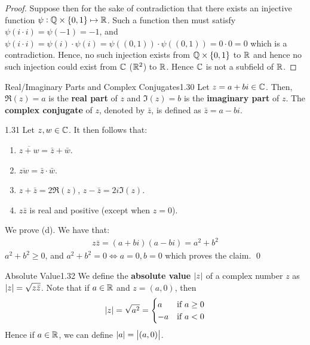 \begin{proof}
    Suppose then for the sake of contradiction that there exists an injective function $\psi: \mathbb{Q} \times \set{0, 1} \mapsto \mathbb{R}$. Such a function then must satisfy$\psi(i \cdot i) = \psi(-1) = -1$, and $\psi(i \cdot i) = \psi(i) \cdot \psi(i) = \psi((0, 1))\cdot \psi((0, 1)) = 0 \cdot 0 = 0$ which is a contradiction. Hence, no such injection exists from $\mathbb{Q} \times \set{0, 1}$ to $\mathbb{R}$ and hence no such injection could exist from $\mathbb{C}$ ($\mathbb{R}^2$) to $\mathbb{R}$. Hence $\mathbb{C}$ is not a subfield of $\mathbb{R}$. 
\end{proof}



\begin{definition}{Real/Imaginary Parts and Complex Conjugates}{1.30}
Let $z = a + bi \in \mathbb{C}$. Then, $\Re(z) = a$ is the \textbf{real part} of $z$ and $\Im(z) = b$ is the \textbf{imaginary part} of $z$. The \textbf{complex conjugate} of $z$, denoted by $\bar{z}$, is defined as $\bar{z} = a - bi$. 
\end{definition}

\begin{theorem}{}{1.31}
    Let $z, w \in \mathbb{C}$. It then follows that:
    \begin{enumerate}
        \item $\overline{z + w} = \bar{z} + \bar{w}$.
        \item $\overline{zw} = \bar{z} \cdot \bar{w}$.
        \item $z + \bar{z} = 2\Re(z)$, $z - \bar{z} = 2i\Im(z)$.
        \item $z\bar{z}$ is real and positive (except when $z = 0$).
    \end{enumerate}
\end{theorem}

\begin{nproof}
    We prove (d). We have that:
    \begin{align*}
        z\bar{z} = (a + bi)(a-bi) = a^2 + b^2 
    \end{align*}
    $a^2 + b^2 \geq 0$, and $a^2 + b^2 = 0 \iff a = 0, b = 0$ which proves the claim. \qed
\end{nproof}

\begin{definition}{Absolute Value}{1.32}
    We define the \textbf{absolute value} $\abs{z}$ of a complex number $z$ as $\abs{z} = \sqrt{z\bar{z}}$. Note that if $a \in \mathbb{R}$ and $z = (a, 0)$, then
    \begin{align*}
        \abs{z} = \sqrt{a^2} =
        \begin{cases}
            a & \text{if $a \geq 0$}
            \\ -a & \text{if $a < 0$}
        \end{cases}
    \end{align*}
    Hence if $a \in \mathbb{R}$, we can define $\abs{a} = \abs{(a, 0)}$. 
\end{definition}

